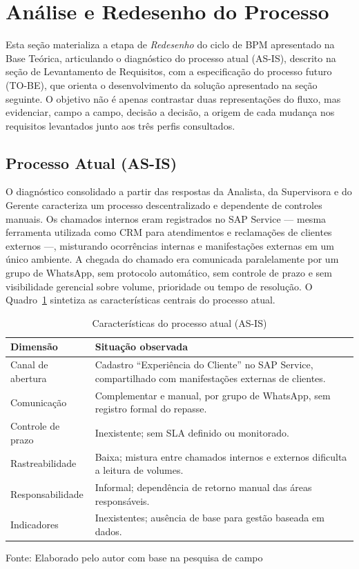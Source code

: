 \section{Análise e Redesenho do Processo}

Esta seção materializa a etapa de \textit{Redesenho} do ciclo
de BPM apresentado na Base Teórica, articulando o diagnóstico
do processo atual (AS-IS), descrito na seção de Levantamento
de Requisitos, com a especificação do processo futuro
(TO-BE), que orienta o desenvolvimento da solução apresentado
na seção seguinte. O objetivo não é apenas contrastar duas
representações do fluxo, mas evidenciar, campo a campo,
decisão a decisão, a origem de cada mudança nos requisitos
levantados junto aos três perfis consultados.

\subsection{Processo Atual (AS-IS)}

O diagnóstico consolidado a partir das respostas da Analista,
da Supervisora e do Gerente caracteriza um processo
descentralizado e dependente de controles manuais. Os
chamados internos eram registrados no SAP Service --- mesma
ferramenta utilizada como CRM para atendimentos e reclamações
de clientes externos ---, misturando ocorrências internas e
manifestações externas em um único ambiente. A chegada do
chamado era comunicada paralelamente por um grupo de
WhatsApp, sem protocolo automático, sem controle de prazo e
sem visibilidade gerencial sobre volume, prioridade ou tempo
de resolução. O Quadro~\ref{quadro:as-is} sintetiza as
características centrais do processo atual.

\begin{table}[H]
\caption{Características do processo atual (AS-IS)}
\label{quadro:as-is}
\centering
\begin{tabular}{p{3.6cm} p{8.2cm}}
\hline
\textbf{Dimensão} & \textbf{Situação observada} \\
\hline
Canal de abertura & Cadastro ``Experiência do Cliente'' no
SAP Service, compartilhado com manifestações externas de
clientes. \\
\hline
Comunicação & Complementar e manual, por grupo de WhatsApp,
sem registro formal do repasse. \\
\hline
Controle de prazo & Inexistente; sem SLA definido ou
monitorado. \\
\hline
Rastreabilidade & Baixa; mistura entre chamados internos e
externos dificulta a leitura de volumes. \\
\hline
Responsabilidade & Informal; dependência de retorno manual
das áreas responsáveis. \\
\hline
Indicadores & Inexistentes; ausência de base para gestão
baseada em dados. \\
\hline
\end{tabular}
\raggedright
\par
{\fontsize{10}{12}\selectfont Fonte: Elaborado pelo autor com
base na pesquisa de campo}
\end{table}

